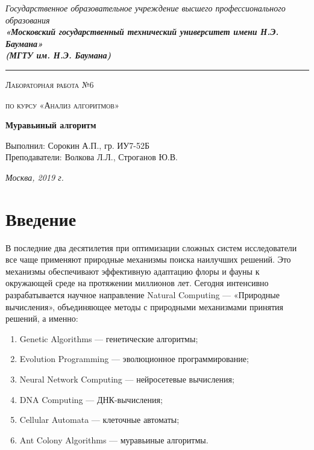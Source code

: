 \documentclass[12pt, a4paper]{report}
\begin{document}
 	\begin{titlepage}
 		
 		\begin{center}
 			\Large
 			{\sl Государственное образовательное учреждение высшего профессионального образования\\
 				{\bf«Московский государственный технический университет имени Н.Э. Баумана»\\
 					(МГТУ им. Н.Э. Баумана)}}
 			\noindent\rule{\textwidth}{2pt}
 			\vspace{3cm}
 			
 			{\scshape\LARGE Лабораторная работа №6 \par}
 			\vspace{0.5cm}	
 			{\scshape\LARGE по курсу «Анализ алгоритмов» \par}
 			\vspace{1.5cm}
 			{\huge\bfseries Муравьиный алгоритм \par}
 			\vspace{2cm}
 			\Large Выполнил: Сорокин А.П., гр. ИУ7-52Б\\
 			\vspace{0.5cm}
 			{\Large Преподаватели: Волкова Л.Л., Строганов Ю.В.}
 			
 			\vfill
 			\Large \textit {Москва, 2019 г.}
 			
 		\end{center}
 		
 	\end{titlepage}
 	
 	\tableofcontents
	\newpage
	
	\chapter*{Введение}
	
	
	В последние два десятилетия при оптимизации сложных систем исследователи все чаще применяют природные механизмы поиска наилучших решений. Это механизмы обеспечивают эффективную адаптацию флоры и фауны к окружающей среде на протяжении миллионов лет. Сегодня интенсивно разрабатывается научное направление Natural Computing — «Природные вычисления», объединяющее методы с природными механизмами принятия решений, а именно:
	\begin{enumerate}
	\item Genetic Algorithms — генетические алгоритмы;
	\item Evolution Programming — эволюционное программирование;
	\item Neural Network Computing — нейросетевые вычисления;
	\item DNA Computing — ДНК-вычисления;
	\item Cellular Automata — клеточные автоматы;
	\item Ant Colony Algorithms — муравьиные алгоритмы.
	\end{enumerate}
\end{document}

